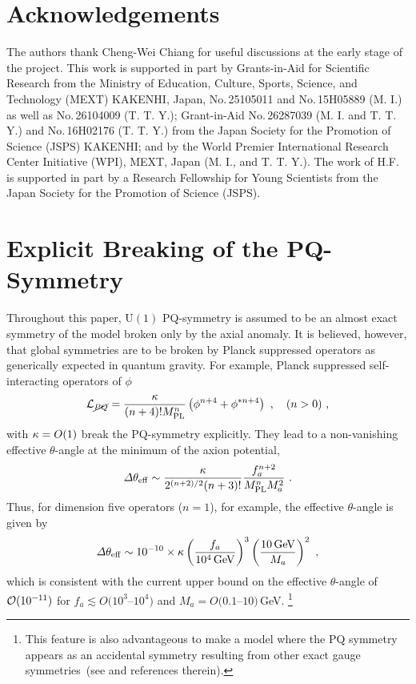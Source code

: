 \documentclass[aps,amsmath,preprint,epsf,superscriptaddress,nofootinbib,notitlepage]{revtex4-1}
\begin{document}
\section*{Acknowledgements}
The authors thank Cheng-Wei Chiang for useful discussions  at the early stage of the project.
This work is supported in part by Grants-in-Aid for Scientific Research from the Ministry of Education, Culture, Sports, Science, and Technology (MEXT) KAKENHI, 
Japan, No.\,25105011 and No.\,15H05889 (M. I.) as well as No.\,26104009 (T. T. Y.); Grant-in-Aid No.\,26287039 (M. I. and T. T. Y.) and  No.\,16H02176 (T. T. Y.) 
 from the Japan Society for the Promotion of Science (JSPS) KAKENHI; and by the World Premier International Research Center Initiative (WPI), MEXT, Japan (M. I., and T. T. Y.).
 The work of H.F. is supported in part by a Research Fellowship for
 Young Scientists from the Japan Society for the Promotion of Science (JSPS).

\appendix
\section{Explicit Breaking of the PQ-Symmetry}
\label{sec:breaking}
Throughout this paper, $\text{U}(1)$ PQ-symmetry is assumed to be an almost exact symmetry of the model
broken only by the axial anomaly.
It is believed, however, that global symmetries are to be broken by Planck suppressed operators as generically expected  in quantum gravity.
For example, Planck suppressed  self-interacting operators of $\phi$
\begin{eqnarray}\label{eq:QG}
{\cal L}_{\cancel{PQ}} = \frac{\kappa}{(n+4)!M_{\rm PL}^{n}} \left(\phi^{n+4} + \phi^{*n+4}\right)\ ,\quad (n> 0) \ ,
\end{eqnarray}
with $\kappa = O(1)$ break the PQ-symmetry explicitly.
They lead to a non-vanishing effective $\theta$-angle at the minimum of the axion potential, 
\begin{eqnarray}
{\mit\Delta}\theta_{\rm eff} \sim \frac{\kappa}{2^{(n+2)/2} (n+3)!}\frac{f_a^{n+2}}{M_{\rm PL}^n M_a^2}\ .
\end{eqnarray}
Thus, for dimension five operators ($n=1$), for example, the effective $\theta$-angle is given by
\begin{eqnarray}
{\mit \Delta} \theta_{\rm eff} \sim 10^{-10} \times\kappa\left(\frac{f_a}{10^{4}\,\rm GeV}\right)^{3}\left(\frac{10\,\rm GeV}{M_a}\right)^2\ ,
\end{eqnarray}
which is consistent with the current upper bound on the effective $\theta$-angle of ${\cal O}(10^{-11})$ for $f_a \lesssim O(10^3$--$10^4)$ and $M_a =O(0.1$--$10)$\,GeV.%
\footnote{This feature is also advantageous to make a model where the PQ symmetry appears as an accidental 
symmetry resulting from other exact gauge symmetries~(see \cite{Harigaya:2013vja,Redi:2016esr} and references therein).%
}
\end{document}
